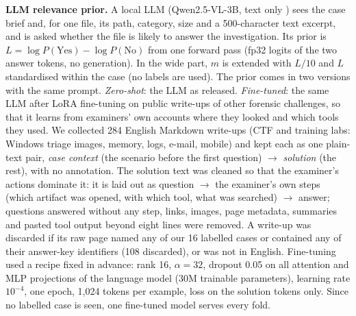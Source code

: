 \documentclass[conference]{IEEEtran}
\begin{document}
\textbf{LLM relevance prior.} A local LLM (Qwen2.5-VL-3B, text only \cite{qwen25vl}) sees the case brief and, for one
file, its path, category, size and a 500-character text excerpt, and is asked whether the file is likely to answer the
investigation. Its prior is $L=\log P(\text{Yes})-\log P(\text{No})$ from one forward pass (fp32 logits of the two
answer tokens, no generation). In the wide part, $m$ is extended with $L/10$ and $L$ standardised within the case (no
labels are used). The prior comes in two versions with the same prompt. \emph{Zero-shot}: the LLM as released.
\emph{Fine-tuned}: the same LLM after LoRA fine-tuning \cite{hu2022lora} on public write-ups of other forensic
challenges, so that it learns from examiners' own accounts where they looked and which tools they used. We collected
284 English Markdown write-ups (CTF and training labs: Windows triage images, memory, logs, e-mail, mobile) and kept each
as one plain-text pair, \emph{case context} (the scenario before the first question) $\rightarrow$ \emph{solution}
(the rest), with no annotation. The solution text was cleaned so that the examiner's actions dominate it: it is laid out
as question $\rightarrow$ the examiner's own steps (which artifact was opened, with which tool, what was searched)
$\rightarrow$ answer; questions answered without any step, links, images, page metadata, summaries and pasted tool
output beyond eight lines were removed. A write-up was discarded if its raw page named any of our 16 labelled cases or
contained any of their answer-key identifiers (108 discarded), or was not in English. Fine-tuning used a recipe fixed in advance: rank 16, $\alpha=32$,
dropout 0.05 on all attention and MLP projections of the language model (30M trainable parameters), learning rate
$10^{-4}$, one epoch, 1{,}024 tokens per example, loss on the solution tokens only. Since no labelled case is seen, one
fine-tuned model serves every fold.
\end{document}
